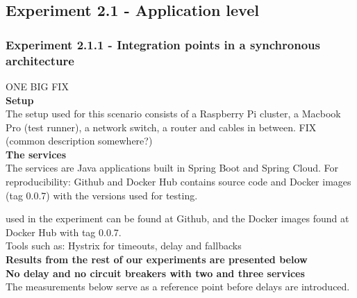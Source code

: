 
\subsection*{Experiment 2.1 - Application level}
\subsubsection*{Experiment 2.1.1 - Integration points in a synchronous architecture} 

\noindent ONE BIG FIX \\ 

\noindent \textbf{Setup}\\
The setup used for this scenario consists of a Raspberry Pi cluster, a Macbook Pro (test runner), a network switch, a router and cables in between. FIX (common description somewhere?) \\

\noindent \textbf{The services}\\
The services are Java applications built in Spring Boot and Spring Cloud.
For reproducibility: Github and Docker Hub contains source code and Docker images (tag 0.0.7) with the versions used for testing.

used in the experiment can be found at Github, and the Docker images found at Docker Hub with tag 0.0.7.
\\ 
Tools such as: Hystrix for timeouts, delay and fallbacks \\


\noindent \textbf{Results from the rest of our experiments are presented below} \\

\noindent \textbf{No delay and no circuit breakers with two and three services} \\
The measurements below serve as a reference point before delays are introduced.

